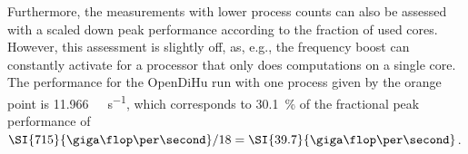 Furthermore, the measurements with lower process counts can also be assessed with a scaled down peak performance according to the fraction of used cores. However, this assessment is slightly off, as, e.g., the frequency boost can constantly activate for a processor that only does computations on a single core. The performance for the OpenDiHu run with one process given by the orange point is \SI{11.966}{\giga\flop\per\second}, which corresponds to \SI{30.1}{\percent} of the fractional peak performance of $\SI{715}{\giga\flop\per\second}/18 = \SI{39.7}{\giga\flop\per\second}$.

% 

